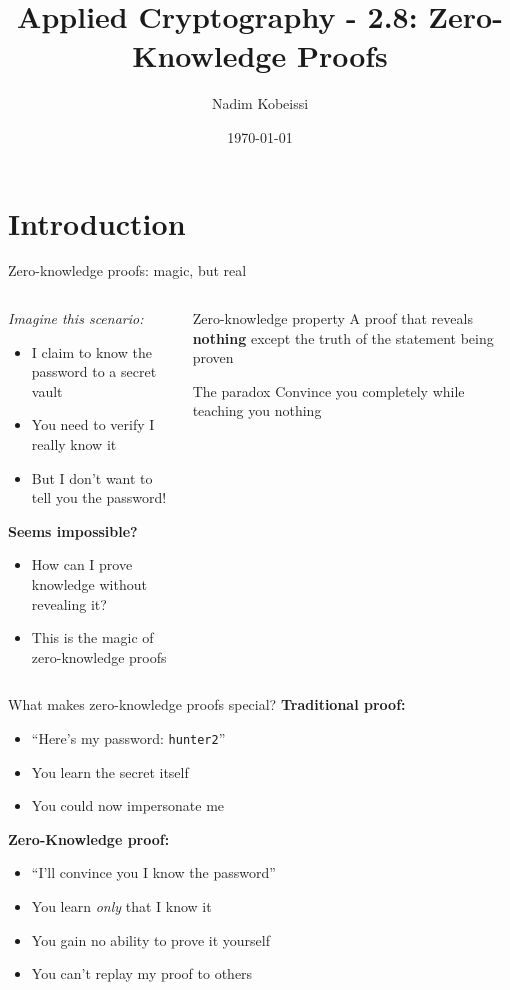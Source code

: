 \documentclass[aspectratio=169, lualatex, handout]{beamer}
\title{Applied Cryptography - 2.8: Zero-Knowledge Proofs}
\author{Nadim Kobeissi}
\institute{American University of Beirut}
\date{\today}
\begin{document}
\begin{frame}[plain]
	\titlepage
\end{frame}

\section{Introduction}

\begin{frame}{Zero-knowledge proofs: magic, but real}
	\begin{columns}[c]
		\begin{column}{0.5\textwidth}
			\em {Imagine this scenario:}
			\begin{itemize}
				\item I claim to know the password to a secret vault
				\item You need to verify I really know it
				\item But I don't want to tell you the password!
			\end{itemize}
			\textbf{Seems impossible?}
			\begin{itemize}
				\item How can I prove knowledge without revealing it?
				\item This is the magic of zero-knowledge proofs
			\end{itemize}
		\end{column}
		\begin{column}{0.5\textwidth}
			\begin{block}{Zero-knowledge property}
				A proof that reveals \textbf{nothing} except the truth of the statement being proven
			\end{block}
			\vspace{0.5em}
			\begin{alertblock}{The paradox}
				Convince you completely while teaching you nothing
			\end{alertblock}
		\end{column}
	\end{columns}
\end{frame}

\begin{frame}{What makes zero-knowledge proofs special?}
	\textbf{Traditional proof:}
	\begin{itemize}
		\item ``Here's my password: \texttt{hunter2}''
		\item You learn the secret itself
		\item You could now impersonate me
	\end{itemize}
	\textbf{Zero-Knowledge proof:}
	\begin{itemize}
		\item ``I'll convince you I know the password''
		\item You learn \textit{only} that I know it
		\item You gain no ability to prove it yourself
		\item You can't replay my proof to others
	\end{itemize}
\end{frame}
\end{document}
